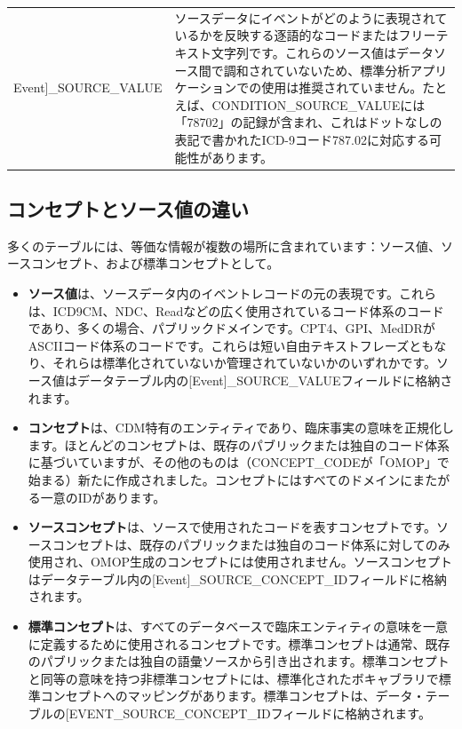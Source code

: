 \documentclass[
  11pt]{book}
\providecommand{\tightlist}{%
  \setlength{\itemsep}{0pt}\setlength{\parskip}{0pt}}
\theoremstyle{definition}
\theoremstyle{definition}
\theoremstyle{definition}
\theoremstyle{definition}
\theoremstyle{remark}
\begin{document}
\begin{longtable}[]{@{}
  >{\raggedright\arraybackslash}p{}
  >{\raggedright\arraybackslash}p{}@{}}
{[}Event{]}\_SOURCE\_VALUE & ソースデータにイベントがどのように表現されているかを反映する逐語的なコードまたはフリーテキスト文字列です。これらのソース値はデータソース間で調和されていないため、標準分析アプリケーションでの使用は推奨されていません。たとえば、CONDITION\_SOURCE\_VALUEには「78702」の記録が含まれ、これはドットなしの表記で書かれたICD-9コード787.02に対応する可能性があります。 \\
\end{longtable}

\subsection{コンセプトとソース値の違い}\label{concepts-Sources}

多くのテーブルには、等価な情報が複数の場所に含まれています：ソース値、ソースコンセプト、および標準コンセプトとして。

\begin{itemize}
\tightlist
\item
  \textbf{ソース値}は、ソースデータ内のイベントレコードの元の表現です。これらは、ICD9CM、NDC、Readなどの広く使用されているコード体系のコードであり、多くの場合、パブリックドメインです。CPT4、GPI、MedDRがASCIIコード体系のコードです。これらは短い自由テキストフレーズともなり、それらは標準化されていないか管理されていないかのいずれかです。ソース値はデータテーブル内の{[}Event{]}\_SOURCE\_VALUEフィールドに格納されます。
\item
  \textbf{コンセプト}は、CDM特有のエンティティであり、臨床事実の意味を正規化します。ほとんどのコンセプトは、既存のパブリックまたは独自のコード体系に基づいていますが、その他のものは（CONCEPT\_CODEが「OMOP」で始まる）新たに作成されました。コンセプトにはすべてのドメインにまたがる一意のIDがあります。
\item
  \textbf{ソースコンセプト}は、ソースで使用されたコードを表すコンセプトです。ソースコンセプトは、既存のパブリックまたは独自のコード体系に対してのみ使用され、OMOP生成のコンセプトには使用されません。ソースコンセプトはデータテーブル内の{[}Event{]}\_SOURCE\_CONCEPT\_IDフィールドに格納されます。
\item
  \textbf{標準コンセプト}は、すべてのデータベースで臨床エンティティの意味を一意に定義するために使用されるコンセプトです。標準コンセプトは通常、既存のパブリックまたは独自の語彙ソースから引き出されます。標準コンセプトと同等の意味を持つ非標準コンセプトには、標準化されたボキャブラリで標準コンセプトへのマッピングがあります。標準コンセプトは、データ・テーブルの{[}EVENT\_SOURCE\_CONCEPT\_IDフィールドに格納されます。
\end{itemize}
\end{document}
